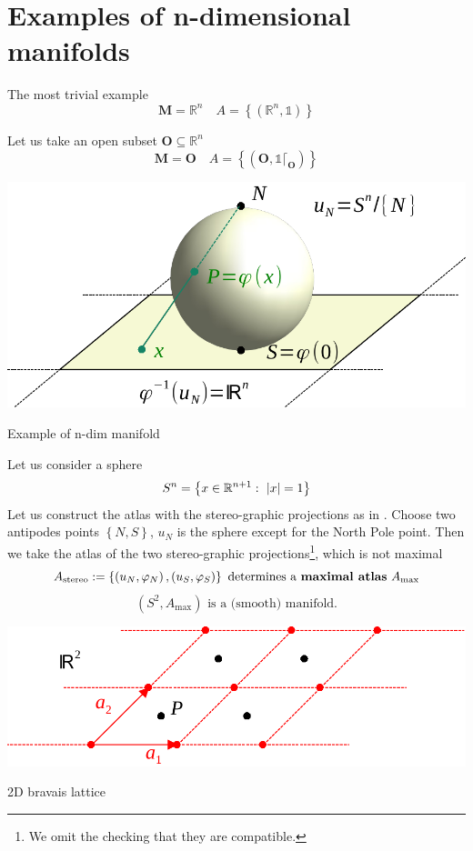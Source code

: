 \documentclass[../main.tex]{subfiles}
\begin{document}
\section[Examples of n-dim manifolds]{Examples of n-dimensional manifolds}
\begin{example}
The most trivial example
\[
\mathbf{M}=\mathbb{R}^n \quad A=\left\{\left(\mathbb{R}^n,\mathbb{1}\right)\right\}
\]
\end{example}
\begin{example}
Let us take an open subset $\mathbf{O}\subseteq\mathbb{R}^n$
\[
\mathbf{M}=\mathbf{O} \quad A=\left\{\left(\mathbf{O},\mathbb{1}\lceil_{\mathbf{O}}\right)\right\}
\]
\end{example}
\begin{marginfigure}
	\includegraphics[width=1.1\linewidth]{images/esempio_1_sfera.pdf}
	\caption[Example of n-dim manifold]{Example of n-dim manifold}
\end{marginfigure} 
\begin{example}
Let us consider a sphere
\[
S^n=\left\{x\in\mathbb{R}^{n+1}:\ \abs{x}=1\right\}
\]
Let us construct the atlas with the stereo-graphic projections as in . Choose two antipodes points $\left\{N,S\right\}$, $u_N$ is the sphere except for the North Pole point. Then we take the atlas of the two stereo-graphic projections\footnote{We omit the checking that they are compatible.}, which is not maximal
\[
A_{\textrm{stereo}}:=\left\{\left(u_N,\varphi_N\right), \left(u_S,\varphi_S\right)\right\} \ \textrm{determines a \textbf{maximal atlas} } A_{\textrm{max}}
\]
\[
\left(S^2,A_{\textrm{max}}\right) \textrm{ is a (smooth) manifold.}
\]
\end{example}
\begin{marginfigure}
	\includegraphics[width=1.1\linewidth]{images/bravais_lattice.pdf}
	\caption[2D bravais lattice]{2D bravais lattice}
\end{marginfigure} 
\end{document}
